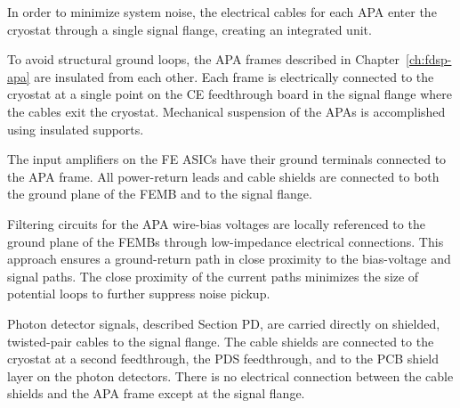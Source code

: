 In order to minimize system noise, the electrical cables for each APA enter the cryostat through a single signal flange, creating an integrated unit.

To avoid structural ground loops, the APA frames described in Chapter~\ref{ch:fdsp-apa} are insulated from each other. Each frame is electrically connected to the cryostat at a single point on the CE feedthrough board in the signal flange where the cables exit the cryostat. Mechanical suspension of the APAs is accomplished using insulated supports. 

The input amplifiers on the FE ASICs have their ground terminals connected to the APA frame.  All power-return leads and cable shields are connected to both the ground plane of the FEMB and to the signal flange.

Filtering circuits for the APA wire-bias voltages are locally referenced to the ground plane of the FEMBs through low-impedance electrical connections. This approach ensures a ground-return path in close proximity to the bias-voltage and signal paths. The close proximity of the current paths minimizes the size of potential loops to further suppress noise pickup.

Photon detector signals, described Section PD, are carried directly on shielded, twisted-pair cables to the signal flange. The cable shields are connected to the cryostat at a second feedthrough, the PDS feedthrough, and to the PCB shield layer on the photon detectors. There is no electrical connection between the cable shields and the APA frame except at the signal flange.

